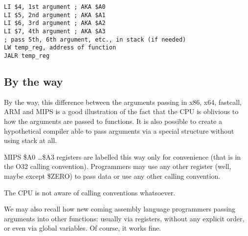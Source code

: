 \begin{lstlisting}[caption=MIPS (O32 calling convention)]
LI $4, 1st argument ; AKA $A0
LI $5, 2nd argument ; AKA $A1
LI $6, 3rd argument ; AKA $A2
LI $7, 4th argument ; AKA $A3
; pass 5th, 6th argument, etc., in stack (if needed)
LW temp_reg, address of function
JALR temp_reg
\end{lstlisting}

\subsection{By the way}

By the way, this difference between the arguments passing in x86, x64, 
fastcall, ARM and MIPS is a good illustration of the fact that the CPU is oblivious to how the arguments are passed to functions. 
It is also possible to create a hypothetical compiler able to pass arguments 
via a special structure without using stack at all.

MIPS \$A0 \dots \$A3 registers are labelled this way only for convenience (that is in the O32 calling convention).
Programmers may use any other register (well, maybe except \$ZERO) 
to pass data or use any other calling convention.

The \ac{CPU} is not aware of calling conventions whatsoever.

We may also recall how new coming assembly language programmers passing arguments into
other functions: usually via registers, without any explicit order, or even via global variables.
Of course, it works fine.

